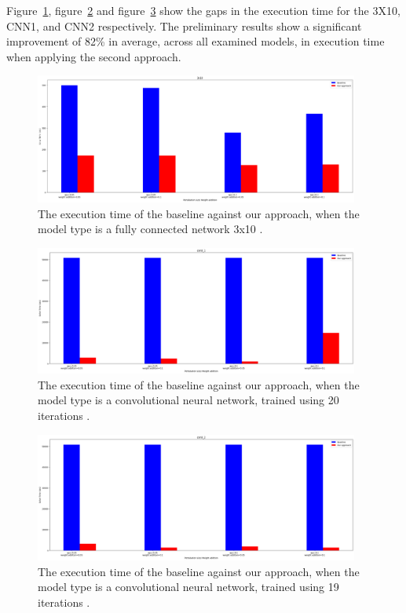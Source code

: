 Figure~\ref{fig:3_x_10}, figure~\ref{fig:cnn0_1} and figure~\ref{fig:cnn0_2} show the gaps in the execution time for the 3X10, CNN1, and CNN2 respectively.
The preliminary results show a significant improvement of 82\% in average, across all examined models, in execution time when applying the second approach. 
\begin{figure}[ht]
  \centering
  \includegraphics[width=0.95\textwidth]{3x10.png}
  \caption{The execution time of the baseline against our approach, when the model type is a fully connected network 3x10 .}
  \label{fig:3_x_10}
\end{figure}

\begin{figure}[ht]
  \centering
  \includegraphics[width=0.95\textwidth]{cnn0_1.png}
  \caption{The execution time of the baseline against our approach, when the model type is a convolutional neural network, trained using 20 iterations .}
  \label{fig:cnn0_1}
\end{figure}

\begin{figure}[ht]
  \centering
  \includegraphics[width=0.95\textwidth]{cnn0_2.png}
  \caption{The execution time of the baseline against our approach, when the model type is a convolutional neural network, trained using 19 iterations .}
  \label{fig:cnn0_2}
\end{figure}


